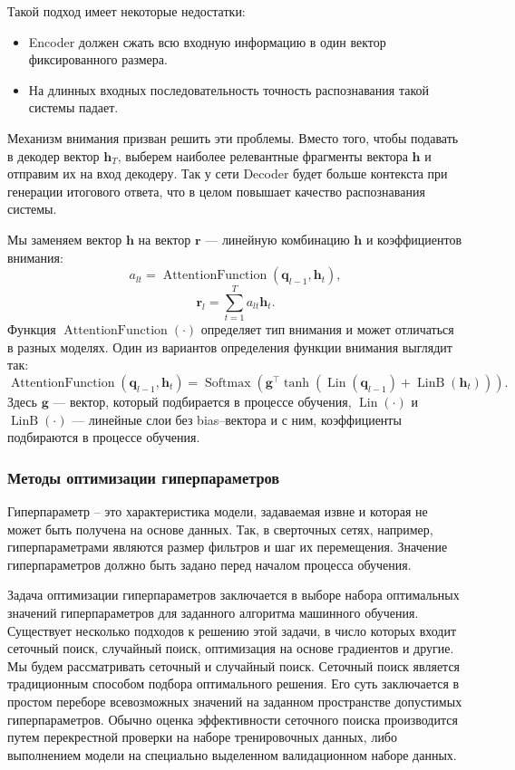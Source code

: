 Такой подход имеет некоторые недостатки:
\begin{itemize}
	\item Encoder должен сжать всю входную информацию в один вектор фиксированного размера.
	\item На длинных входных последовательность точность распознавания такой системы падает.
\end{itemize}

Механизм внимания призван решить эти проблемы. Вместо того, чтобы подавать в декодер вектор $\mathbf{h}_T$, выберем наиболее релевантные фрагменты вектора $\mathbf{h}$ и отправим их на вход декодеру. Так у сети Decoder будет больше контекста при генерации итогового ответа, что в целом повышает качество распознавания системы.

Мы заменяем вектор $\mathbf{h}$ на вектор $\mathbf{r}$ --- линейную комбинацию $\mathbf{h}$ и коэффициентов внимания:
$$a_{lt} = \operatorname{AttentionFunction}(\mathbf{q}_{l - 1}, \mathbf{h}_t),$$
$$\mathbf{r}_l = \sum_{t = 1}^{T} a_{lt}\mathbf{h}_t.$$
Функция $\operatorname{AttentionFunction}(\cdot)$ определяет тип внимания и может отличаться в разных моделях. Один из вариантов определения функции внимания выглядит так:
$$\operatorname{AttentionFunction}(\mathbf{q}_{l - 1}, \mathbf{h}_t) = \operatorname{Softmax}(\mathbf{g}^\top \tanh(\operatorname{Lin}(\mathbf{q}_{l - 1}) + \operatorname{LinB}(\mathbf{h}_t))).$$
Здесь $\mathbf{g}$ --- вектор, который подбирается в процессе обучения, $\operatorname{Lin}(\cdot)$ и $\operatorname{LinB}(\cdot)$ --- линейные слои без bias--вектора и с ним, коэффициенты подбираются в процессе обучения.

\subsubsection{Методы оптимизации гиперпараметров}
Гиперпараметр -- это характеристика модели, задаваемая извне и которая не может быть получена на основе данных. Так, в сверточных сетях, например, гиперпараметрами являются размер фильтров и шаг их перемещения. Значение гиперпараметров должно быть задано перед началом процесса обучения.

Задача оптимизации гиперпараметров\cite{hyperparamopt-overview} заключается в выборе набора оптимальных значений гиперпараметров для заданного алгоритма машинного обучения. Существует несколько подходов к решению этой задачи, в число которых входит сеточный поиск, случайный поиск, оптимизация на основе градиентов и другие.
Мы будем рассматривать сеточный и случайный поиск. Сеточный поиск является традиционным способом подбора оптимального решения. Его суть заключается в простом переборе всевозможных значений на заданном пространстве допустимых гиперпараметров. Обычно оценка эффективности сеточного поиска производится путем перекрестной проверки на наборе тренировочных данных, либо выполнением модели на специально выделенном валидационном наборе данных.

